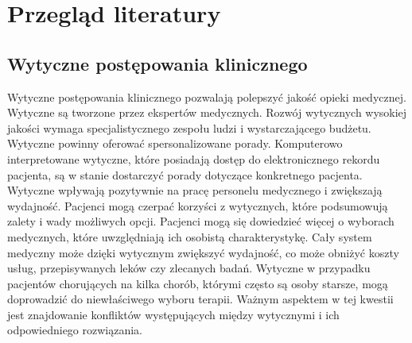\chapter{Przegląd literatury}
\section{Wytyczne postępowania klinicznego}


Wytyczne postępowania klinicznego\cite{Boyd, Latoszek-Berendsen} pozwalają polepszyć jakość opieki medycznej. Wytyczne są tworzone przez ekspertów medycznych. Rozwój wytycznych wysokiej jakości wymaga specjalistycznego zespołu ludzi i wystarczającego budżetu. Wytyczne powinny oferować spersonalizowane porady. Komputerowo interpretowane wytyczne, które posiadają dostęp do elektronicznego rekordu pacjenta, są w stanie dostarczyć porady dotyczące konkretnego pacjenta. Wytyczne wpływają pozytywnie na pracę personelu medycznego i zwiększają wydajność. Pacjenci mogą czerpać korzyści z wytycznych, które podsumowują zalety i wady możliwych opcji. Pacjenci mogą się dowiedzieć więcej o wyborach medycznych, które uwzględniają ich osobistą charakterystykę. Cały system medyczny może dzięki wytycznym zwiększyć wydajność, co może obniżyć koszty usług, przepisywanych leków czy zlecanych badań. Wytyczne w przypadku pacjentów chorujących na kilka chorób, którymi często są osoby starsze, mogą doprowadzić do niewłaściwego wyboru terapii. Ważnym aspektem w tej kwestii jest znajdowanie konfliktów występujących między wytycznymi i ich odpowiedniego rozwiązania.

